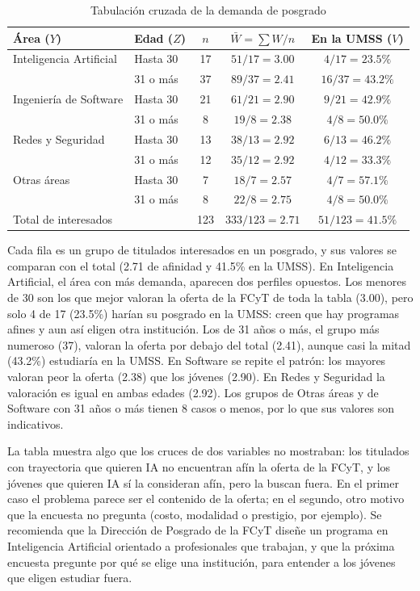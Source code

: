 \documentclass[12pt, a4paper]{article}
\newenvironment{mitabla}[2][H]{%
  \begin{table}[#1]
  \centering
  \caption{#2}
  \small
}{%
  \end{table}
}
\begin{document}
\begin{mitabla}{Tabulación cruzada de la demanda de posgrado}\label{tab:a2-multi}
\begin{tabular}{llccc}
\toprule
\textbf{Área ($Y$)} & \textbf{Edad ($Z$)} & \textbf{$n$} & \textbf{$\bar{W} = \sum W/n$} & \textbf{En la UMSS ($V$)} \\
\midrule
Inteligencia Artificial & Hasta 30 & 17 & $51/17 = 3.00$ & $4/17 = 23.5\%$ \\
 & 31 o más & 37 & $89/37 = 2.41$ & $16/37 = 43.2\%$ \\
Ingeniería de Software & Hasta 30 & 21 & $61/21 = 2.90$ & $9/21 = 42.9\%$ \\
 & 31 o más & 8 & $19/8 = 2.38$ & $4/8 = 50.0\%$ \\
Redes y Seguridad & Hasta 30 & 13 & $38/13 = 2.92$ & $6/13 = 46.2\%$ \\
 & 31 o más & 12 & $35/12 = 2.92$ & $4/12 = 33.3\%$ \\
Otras áreas & Hasta 30 & 7 & $18/7 = 2.57$ & $4/7 = 57.1\%$ \\
 & 31 o más & 8 & $22/8 = 2.75$ & $4/8 = 50.0\%$ \\
\midrule
\multicolumn{2}{l}{Total de interesados} & 123 & $333/123 = 2.71$ & $51/123 = 41.5\%$ \\
\bottomrule
\end{tabular}
\end{mitabla}

Cada fila es un grupo de titulados interesados en un posgrado, y sus
valores se comparan con el total (2.71 de afinidad y 41.5\% en la UMSS).
En Inteligencia Artificial, el área con más demanda, aparecen dos
perfiles opuestos. Los menores de 30 son los que mejor valoran la oferta
de la FCyT de toda la tabla (3.00), pero solo 4 de 17 (23.5\%) harían su
posgrado en la UMSS: creen que hay programas afines y aun así eligen otra
institución. Los de 31 años o más, el grupo más numeroso (37), valoran
la oferta por debajo del total (2.41), aunque casi la mitad (43.2\%)
estudiaría en la UMSS. En Software se repite el patrón: los mayores valoran peor la
oferta (2.38) que los jóvenes (2.90). En Redes y Seguridad la valoración
es igual en ambas edades (2.92). Los grupos de Otras áreas y de Software
con 31 años o más tienen 8 casos o menos, por lo que sus valores son
indicativos.

La tabla muestra algo que los cruces de dos variables no mostraban: los
titulados con trayectoria que quieren IA no encuentran afín la oferta de
la FCyT, y los jóvenes que quieren IA sí la consideran afín, pero la
buscan fuera. En el primer caso el problema parece ser el contenido de
la oferta; en el segundo, otro motivo que la encuesta no pregunta (costo,
modalidad o prestigio, por ejemplo). Se recomienda que la Dirección de
Posgrado de la FCyT diseñe un programa en Inteligencia Artificial
orientado a profesionales que trabajan, y que la próxima encuesta
pregunte por qué se elige una institución, para entender a los jóvenes
que eligen estudiar fuera.
\end{document}
